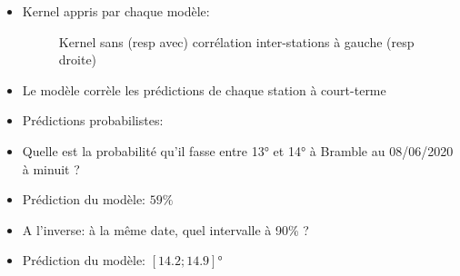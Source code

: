 \documentclass[xcolor=svgnames, t]{beamer}
\newcommand{\toblue}[1]{\textcolor{internationalblue}{#1}}
\begin{document}
\begin{frame}{\subsecname}
  \begin{itemize}
    \item Kernel appris par chaque modèle:
    \begin{figure}
      \centering
      \caption{Kernel sans (resp avec) corrélation inter-stations à gauche (resp droite)}
    \end{figure}
    \pause
    \item Le modèle corrèle les prédictions de chaque station à court-terme
  \end{itemize}
\end{frame}

\begin{frame}{\subsecname}
  \begin{itemize}
    \item Prédictions probabilistes: 
    \pause
    \item Quelle est la probabilité qu'il fasse entre 13° et 14° à Bramble au 08/06/2020 à minuit ?
    \item \toblue{Prédiction} du modèle: $59 \%$
    \pause
    \item A l'inverse: à la même date, quel intervalle à 90\% ?
    \item \toblue{Prédiction} du modèle: $[14.2; 14.9]$° 
  \end{itemize}
\end{frame}
\end{document}
